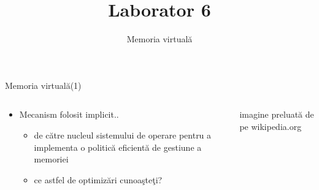 \documentclass{so.cs.pub.ro}
\title[Laborator 6]{Laborator 6}
\subtitle{Memoria virtuală}
\begin{document}
\frame{\titlepage}

\begin{frame}{Memoria virtuală(1)}
\begin{columns}
\begin{column}{0.55\textwidth}
\begin{itemize}
  \item Mecanism folosit implicit..
  \begin{itemize}
    \vspace{0.4cm}
    \item de către nucleul sistemului de operare pentru a implementa o politică eficientă de gestiune a memoriei
    \vspace{0.4cm}
    \item ce astfel de optimizări cunoaşteţi?
  \end{itemize}
\end{itemize}
\end{column}
\begin{column}{0.45\textwidth}
\vspace{0.2cm}
\fontsize{6}{6}\selectfont imagine preluată de pe wikipedia.org
\end{column}
\end{columns}
\end{frame}
\end{document}

